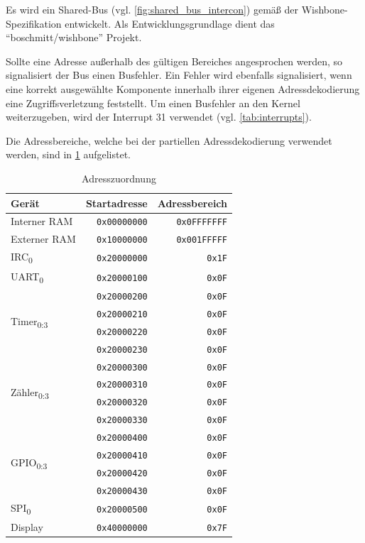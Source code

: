 Es wird ein Shared-Bus (vgl. \cref{fig:shared_bus_intercon}) gemäß der Wishbone-Spezifikation \cites[21]{website:wishbone_b4_spec} entwickelt. Als Entwicklungsgrundlage dient das \enquote{boschmitt/wishbone}\cite{website:boschmitt_wishbone} Projekt. 

Sollte eine Adresse außerhalb des gültigen Bereiches angesprochen werden, so signalisiert der Bus einen Busfehler. Ein Fehler wird ebenfalls signalisiert, wenn eine korrekt ausgewählte Komponente innerhalb ihrer eigenen Adressdekodierung eine Zugriffsverletzung feststellt. Um einen Busfehler an den Kernel weiterzugeben, wird der Interrupt 31 verwendet (vgl. \cref{tab:interrupts}).

Die Adressbereiche, welche bei der partiellen Adressdekodierung verwendet werden, sind in \cref{tab:wb_plasma_zedboard_address_map} aufgelistet.

\begin{table}[!htbp]
	\bigskip
	\centering
	\begin{tabular}{| l | r | r |}
		\hline	
		\textbf{Gerät} & \textbf{Startadresse} & \textbf{Adressbereich} \\
		\hline		
		Interner \gls{RAM} & \texttt{0x00000000} & \texttt{0x0FFFFFFF} \\
		Externer \gls{RAM} & \texttt{0x10000000} & \texttt{0x001FFFFF} \\
		\hline		
		IRC\textsubscript{0} & \texttt{0x20000000} & \texttt{0x1F} \\
		\hline		
		UART\textsubscript{0}& \texttt{0x20000100} & \texttt{0x0F} \\
		\hline
		\multirow{4}{*}{Timer\textsubscript{0:3}} & \texttt{0x20000200} & \texttt{0x0F} \\
		& \texttt{0x20000210} & \texttt{0x0F} \\
		& \texttt{0x20000220} & \texttt{0x0F} \\
		& \texttt{0x20000230} & \texttt{0x0F} \\
		\hline
		\multirow{4}{*}{Zähler\textsubscript{0:3}} & \texttt{0x20000300} & \texttt{0x0F} \\
		& \texttt{0x20000310} & \texttt{0x0F} \\
		& \texttt{0x20000320} & \texttt{0x0F} \\
		& \texttt{0x20000330} & \texttt{0x0F} \\
		\hline
		\multirow{4}{*}{GPIO\textsubscript{0:3}}  & \texttt{0x20000400} & \texttt{0x0F} \\
		& \texttt{0x20000410} & \texttt{0x0F} \\
		& \texttt{0x20000420} & \texttt{0x0F} \\
		& \texttt{0x20000430} & \texttt{0x0F} \\
		\hline
		SPI\textsubscript{0} & \texttt{0x20000500} & \texttt{0x0F} \\
		\hline
		Display & \texttt{0x40000000} & \texttt{0x7F} \\
		\hline
	\end{tabular}
	
	\caption{Adresszuordnung}
	\label{tab:wb_plasma_zedboard_address_map}
\end{table}

